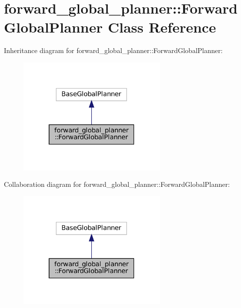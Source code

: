 \hypertarget{classforward__global__planner_1_1ForwardGlobalPlanner}{}\section{forward\+\_\+global\+\_\+planner\+:\+:Forward\+Global\+Planner Class Reference}
\label{classforward__global__planner_1_1ForwardGlobalPlanner}


Inheritance diagram for forward\+\_\+global\+\_\+planner\+:\+:Forward\+Global\+Planner\+:
\nopagebreak
\begin{figure}[H]
\begin{center}
\leavevmode
\includegraphics[width=211pt]{classforward__global__planner_1_1ForwardGlobalPlanner__inherit__graph}
\end{center}
\end{figure}


Collaboration diagram for forward\+\_\+global\+\_\+planner\+:\+:Forward\+Global\+Planner\+:
\nopagebreak
\begin{figure}[H]
\begin{center}
\leavevmode
\includegraphics[width=211pt]{classforward__global__planner_1_1ForwardGlobalPlanner__coll__graph}
\end{center}
\end{figure}

